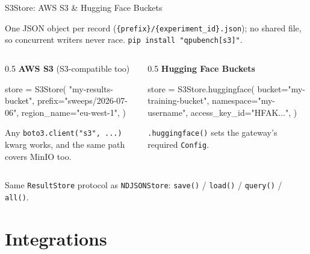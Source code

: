 \documentclass[
  ignorenonframetext,
  aspectratio=169,
]{beamer}
\newenvironment{Shaded}{\begin{snugshade}}{\end{snugshade}}
\newcommand{\NormalTok}[1]{\textcolor[rgb]{0.81,0.81,0.76}{#1}}
\newcommand{\OperatorTok}[1]{\textcolor[rgb]{0.81,0.81,0.76}{#1}}
\newcommand{\StringTok}[1]{\textcolor[rgb]{0.96,0.31,0.31}{#1}}
\begin{document}
\begin{frame}[fragile]{S3Store: AWS S3 \& Hugging Face Buckets}
\label{s3store-aws-s3-hugging-face-buckets}
\footnotesize

One JSON object per record
(\texttt{\{prefix\}/\{experiment\_id\}.json}); no shared file, so
concurrent writers never race.
\texttt{pip\ install\ "qpubench{[}s3{]}"}.

\begin{columns}[T]
\begin{column}{0.5\textwidth}
\textbf{AWS S3} (S3-compatible too)

\begin{Shaded}
\begin{Highlighting}[]
\NormalTok{store }\OperatorTok{=}\NormalTok{ S3Store(}
    \StringTok{"my{-}results{-}bucket"}\NormalTok{,}
\NormalTok{    prefix}\OperatorTok{=}\StringTok{"sweeps/2026{-}07{-}06"}\NormalTok{,}
\NormalTok{    region\_name}\OperatorTok{=}\StringTok{"eu{-}west{-}1"}\NormalTok{,}
\NormalTok{)}
\end{Highlighting}
\end{Shaded}

Any \texttt{boto3.client("s3",\ ...)} kwarg works, and the same path
covers MinIO too.
\end{column}

\begin{column}{0.5\textwidth}
\textbf{Hugging Face Buckets}

\begin{Shaded}
\begin{Highlighting}[]
\NormalTok{store }\OperatorTok{=}\NormalTok{ S3Store.huggingface(}
\NormalTok{    bucket}\OperatorTok{=}\StringTok{"my{-}training{-}bucket"}\NormalTok{,}
\NormalTok{    namespace}\OperatorTok{=}\StringTok{"my{-}username"}\NormalTok{,}
\NormalTok{    access\_key\_id}\OperatorTok{=}\StringTok{"HFAK..."}\NormalTok{,}
\NormalTok{)}
\end{Highlighting}
\end{Shaded}

\texttt{.huggingface()} sets the gateway's required \texttt{Config}.
\end{column}
\end{columns}

Same \texttt{ResultStore} protocol as \texttt{NDJSONStore}:
\texttt{save()} / \texttt{load()} / \texttt{query()} / \texttt{all()}.
\normalsize
\end{frame}

\section{Integrations}\label{integrations}
\end{document}
